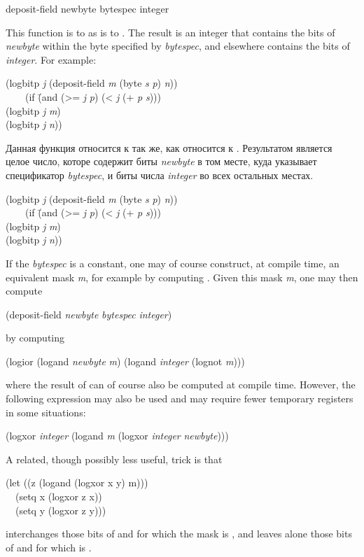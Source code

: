 \begin{defun}[Function]
deposit-field newbyte bytespec integer

This function is to  as  is to .
The result is an integer that contains the bits of \emph{newbyte}
within the byte specified by \emph{bytespec}, and elsewhere contains the bits
of \emph{integer}.
For example:
\begin{lisp}
(logbitp \emph{j} (deposit-field \emph{m} (byte \emph{s} \emph{p}) \emph{n})) \\
~~~\EQ\ (if \=(and (>= \emph{j} \emph{p}) (< \emph{j} (+ \emph{p} \emph{s}))) \\
\>(logbitp \emph{j} \emph{m}) \\
\>(logbitp \emph{j} \emph{n}))
\end{lisp}

Данная функция относится к  так же, как  относится к
.
Результатом является целое число, которе содержит биты \emph{newbyte} в том
месте, куда указывает спецификатор \emph{bytespec}, и биты числа \emph{integer}
во всех остальных местах.
\begin{lisp}
(logbitp \emph{j} (deposit-field \emph{m} (byte \emph{s} \emph{p}) \emph{n})) \\
~~~\EQ\ (if \=(and (>= \emph{j} \emph{p}) (< \emph{j} (+ \emph{p} \emph{s}))) \\
\>(logbitp \emph{j} \emph{m}) \\
\>(logbitp \emph{j} \emph{n}))
\end{lisp}

\beforenoterule
\begin{implementation}
If the \emph{bytespec} is a constant, one may of course
construct, at compile time, an equivalent mask \emph{m}, for example
by computing .  Given
this mask \emph{m}, one may then compute
\begin{lisp}
(deposit-field \emph{newbyte} \emph{bytespec} \emph{integer})
\end{lisp}
by computing
\begin{lisp}
(logior (logand \emph{newbyte} \emph{m}) (logand \emph{integer} (lognot \emph{m})))
\end{lisp}
where the result of  can of course also be computed
at compile time.  However, the following expression
may also be used and may require fewer
temporary registers in some situations:
\begin{lisp}
(logxor \emph{integer} (logand \emph{m} (logxor \emph{integer} \emph{newbyte})))
\end{lisp}
A related, though possibly less useful, trick is that
\begin{lisp}
(let ((z (logand (logxor x y) m))) \\
~~(setq x (logxor z x)) \\
~~(setq y (logxor z y)))
\end{lisp}
interchanges those bits of  and  for which the mask  is
, and leaves alone those bits of  and  for which  is
.
\end{implementation}
\afternoterule


\end{defun}
